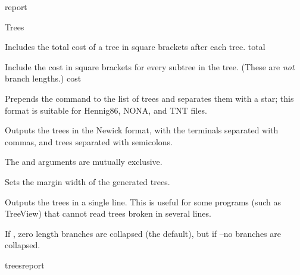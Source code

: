 \begin{command}{report}{}
\begin{arguments}
\begin{argumentgroup}{Trees}
{                \begin{description}
                        {Includes the total cost of a tree in square brackets
                        after each tree.}
                        {total}

                        {Include the cost in square brackets for every subtree in the tree. (These 
                        are \emph{not} branch lengths.)}
                        {cost}

                        {Prepends the  command to the list of
                        trees and separates them with a star; this format is
                        suitable for Hennig86, NONA, and TNT files.}
                        {}
                        
                        {Outputs the trees in the Newick format, with the
                        terminals separated with commas, and trees separated
                        with semicolons.}
                        {}
	    \begin{statement}
	     The  and  arguments are 
	     mutually exclusive.
	     \end{statement}
	     
                        {Sets the margin width of the generated trees.}
                        {}

                        {Outputs the trees in a single line. This is useful for
                        some programs (such as TreeView) that cannot read
                        trees broken in several
                        lines.}
                        {}

                        {If , zero length branches are collapsed (the
                        default), but if --no branches are
                        collapsed.}
                        {}
                    \end{description}}
                {treesreport}

		\end{argumentgroup}


\end{arguments}
\end{command}
